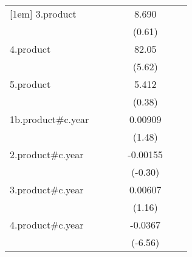 {\begin{tabular}{l*{6}{c}}
[1em]
3.product           &                     &                     &                     &       8.690         &                     &                     \\
                    &                     &                     &                     &      (0.61)         &                     &                     \\
[1em]
4.product           &                     &                     &                     &       82.05\sym{***}&                     &                     \\
                    &                     &                     &                     &      (5.62)         &                     &                     \\
[1em]
5.product           &                     &                     &                     &       5.412         &                     &                     \\
                    &                     &                     &                     &      (0.38)         &                     &                     \\
[1em]
1b.product#c.year   &                     &                     &                     &     0.00909         &                     &                     \\
                    &                     &                     &                     &      (1.48)         &                     &                     \\
[1em]
2.product#c.year    &                     &                     &                     &    -0.00155         &                     &                     \\
                    &                     &                     &                     &     (-0.30)         &                     &                     \\
[1em]
3.product#c.year    &                     &                     &                     &     0.00607         &                     &                     \\
                    &                     &                     &                     &      (1.16)         &                     &                     \\
[1em]
4.product#c.year    &                     &                     &                     &     -0.0367\sym{***}&                     &                     \\
                    &                     &                     &                     &     (-6.56)         &                     &                     \\

\end{tabular}}
